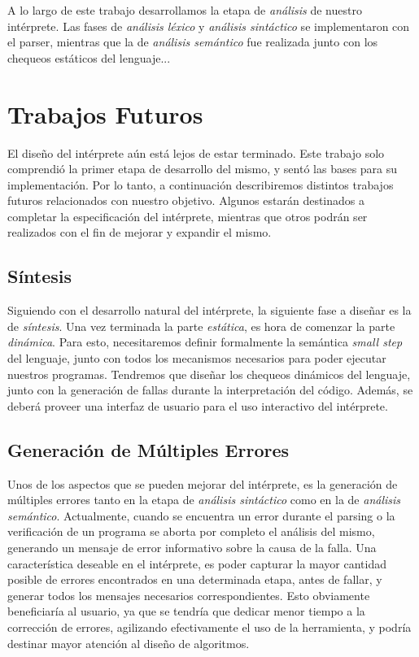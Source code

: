 A lo largo de este trabajo desarrollamos la etapa de \textit{análisis} de nuestro intérprete.
Las fases de \textit{análisis léxico} y \textit{análisis sintáctico} se implementaron con el parser, mientras que la de \textit{análisis semántico} fue realizada junto con los chequeos estáticos del lenguaje...

\section{Trabajos Futuros}

El diseño del intérprete aún está lejos de estar terminado.
Este trabajo solo comprendió la primer etapa de desarrollo del mismo, y sentó las bases para su implementación.
Por lo tanto, a continuación describiremos distintos trabajos futuros relacionados con nuestro objetivo.
Algunos estarán destinados a completar la especificación del intérprete, mientras que otros podrán ser realizados con el fin de mejorar y expandir el mismo.

\subsection{Síntesis}

Siguiendo con el desarrollo natural del intérprete, la siguiente fase a diseñar es la de \textit{síntesis}.
Una vez terminada la parte \textit{estática}, es hora de comenzar la parte \textit{dinámica}.
Para esto, necesitaremos definir formalmente la semántica \textit{small step} del lenguaje, junto con todos los mecanismos necesarios para poder ejecutar nuestros programas.
Tendremos que diseñar los chequeos dinámicos del lenguaje, junto con la generación de fallas durante la interpretación del código. 
Además, se deberá proveer una interfaz de usuario para el uso interactivo del intérprete.

\subsection{Generación de Múltiples Errores}

Unos de los aspectos que se pueden mejorar del intérprete, es la generación de múltiples errores tanto en la etapa de \textit{análisis sintáctico} como en la de \textit{análisis semántico}.
Actualmente, cuando se encuentra un error durante el parsing o la verificación de un programa se aborta por completo el análisis del mismo, generando un mensaje de error informativo sobre la causa de la falla.
Una característica deseable en el intérprete, es poder capturar la mayor cantidad posible de errores encontrados en una determinada etapa, antes de fallar, y generar todos los mensajes necesarios correspondientes.
Esto obviamente beneficiaría al usuario, ya que se tendría que dedicar menor tiempo a la corrección de errores, agilizando efectivamente el uso de la herramienta, y podría destinar mayor atención al diseño de algoritmos.

